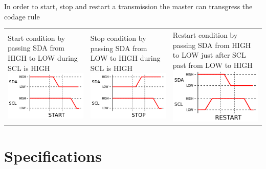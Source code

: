 \documentclass[12pt,a4paper,landscape]{article}
\begin{document}
	{\color{blue}In order to start, stop and restart a transmission the master can transgress the codage rule\\}

		\vspace{1em}

			\begin{tabular}{p{7cm}p{7cm}p{7cm}}
				Start condition by passing SDA from HIGH to LOW during SCL is HIGH
				\newline \newline \newline
				\parbox[]{1em}{\includegraphics[width=6cm]{START_I2C.png}} &
				Stop condition by passing SDA from LOW to HIGH during SCL is HIGH
				\newline \newline \newline
				\parbox[]{1em}{\includegraphics[width=6cm]{STOP_I2C.png}} &
				Restart condition by passing SDA from HIGH to LOW just after SCL past from LOW to HIGH
				\newline \newline
				\parbox[]{1em}{\includegraphics[width=6cm]{RESTART_I2C.png}}\\
			\end{tabular}

\newpage
{}

\section*{Specifications}
	
\end{document}
